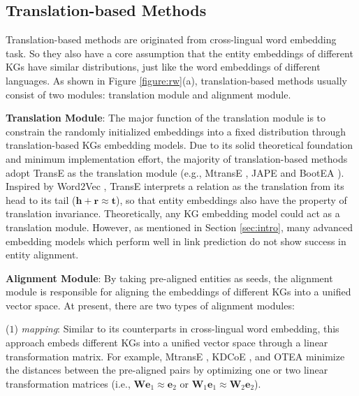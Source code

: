\documentclass[sigconf,camera-ready]{acmart}
\begin{document}
\subsection{Translation-based Methods}
Translation-based methods are originated from cross-lingual word embedding task.
So they also have a core assumption that the entity embeddings of different KGs have similar distributions, just like the word embeddings of different languages.
As shown in Figure \ref{figure:rw}(a), translation-based methods usually consist of two modules: translation module and alignment module.

\textbf{Translation Module}:
The major function of the translation module is to constrain the randomly initialized embeddings into a fixed distribution through translation-based KGs embedding models.
Due to its solid theoretical foundation and minimum implementation effort, the majority of translation-based methods adopt TransE \cite{DBLP:conf/nips/BordesUGWY13} as the translation module (e.g., MtransE \cite{DBLP:conf/ijcai/ChenTYZ17}, JAPE \cite{DBLP:conf/semweb/SunHL17} and BootEA \cite{DBLP:conf/ijcai/SunHZQ18}).
Inspired by Word$2$Vec \cite{DBLP:journals/corr/MikolovLS13}, TransE interprets a relation as the translation from its head to its tail ($\bm{h} + \bm{r} \approx \bm{t}$), so that entity embeddings also have the property of translation invariance.
Theoretically, any KG embedding model could act as a translation module.
However, as mentioned in Section \ref{sec:intro}, many advanced embedding models \cite{DBLP:conf/aaai/DettmersMS018,DBLP:conf/aaai/LinLSLZ15} which perform well in link prediction do not show success in entity alignment.

\textbf{Alignment Module}:
By taking pre-aligned entities as seeds, the alignment module is responsible for aligning the embeddings of different KGs into a unified vector space.
At present, there are two types of alignment modules:

($1$) \emph{mapping}:
Similar to its counterparts in cross-lingual word embedding, this approach embeds different KGs into a unified vector space through a linear transformation matrix.
For example, MtransE \cite{DBLP:conf/ijcai/ChenTYZ17}, KDCoE \cite{DBLP:conf/ijcai/ChenTCSZ18}, and OTEA \cite{DBLP:conf/ijcai/Pei0Z19} minimize the distances between the pre-aligned pairs by optimizing one or two linear transformation matrices (i.e., $ {\bm{W}\bm{e}_1\approx \bm{e}_2}$ or $ {\bm{W}_1\bm{e}_1\approx \bm{W}_2\bm{e}_2}$).
\end{document}
